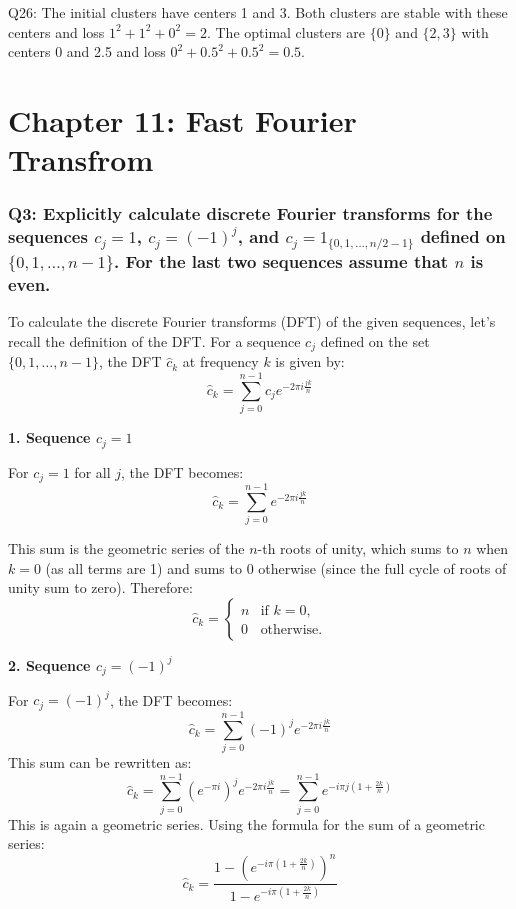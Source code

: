 \documentclass[8pt]{article}
\begin{document}
Q26: The initial clusters have centers 1 and 3. Both clusters are stable with these centers and loss \( 1^2 + 1^2 + 0^2 = 2 \). The optimal clusters are \(\{0\}\) and \(\{2, 3\}\) with centers 0 and 2.5 and loss \( 0^2 + 0.5^2 + 0.5^2 = 0.5 \).

\newpage
\section*{Chapter 11: Fast Fourier Transfrom}

\subsubsection*{Q3:
Explicitly calculate discrete Fourier transforms for the sequences \( c_j = 1 \), \( c_j = (-1)^j \), and \( c_j = 1_{\{0,1,\ldots,n/2-1\}} \) defined on \(\{0, 1, \ldots, n-1\}\). For the last two sequences assume that \(n\) is even.}

To calculate the discrete Fourier transforms (DFT) of the given sequences, let's recall the definition of the DFT. For a sequence \( c_j \) defined on the set \( \{0, 1, \ldots, n-1\} \), the DFT \( \hat{c}_k \) at frequency \( k \) is given by:
\[
\hat{c}_k = \sum_{j=0}^{n-1} c_j e^{-2\pi i \frac{jk}{n}}
\]

\textbf{1. Sequence \( c_j = 1 \)}

For \( c_j = 1 \) for all \( j \), the DFT becomes:
\[
\hat{c}_k = \sum_{j=0}^{n-1} e^{-2\pi i \frac{jk}{n}}
\]

This sum is the geometric series of the \( n \)-th roots of unity, which sums to \( n \) when \( k = 0 \) (as all terms are 1) and sums to 0 otherwise (since the full cycle of roots of unity sum to zero). Therefore:
\[
\hat{c}_k = 
\begin{cases} 
n & \text{if } k = 0, \\
0 & \text{otherwise}.
\end{cases}
\]

\textbf{2. Sequence \( c_j = (-1)^j \)}

For \( c_j = (-1)^j \), the DFT becomes:
\[
\hat{c}_k = \sum_{j=0}^{n-1} (-1)^j e^{-2\pi i \frac{jk}{n}}
\]
This sum can be rewritten as:
\[
\hat{c}_k = \sum_{j=0}^{n-1} (e^{-\pi i})^j e^{-2\pi i \frac{jk}{n}} = \sum_{j=0}^{n-1} e^{-i\pi j(1 + \frac{2k}{n})}
\]
This is again a geometric series. Using the formula for the sum of a geometric series:
\[
\hat{c}_k = \frac{1 - (e^{-i\pi (1 + \frac{2k}{n})})^n}{1 - e^{-i\pi (1 + \frac{2k}{n})}}
\]
\end{document}
